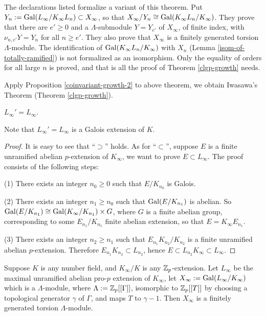 \begin{remark}
The {\Lean} declarations listed formalize a variant of this theorem. Put
$Y_n:={\mathrm{Gal}}(L_\infty/K_\infty L_n)\subset X_\infty$, so that
$X_\infty/Y_n\cong{\mathrm{Gal}}(K_\infty L_n/K_\infty)$. They prove that there are
$e'\geq 0$ and a $\Lambda$-submodule $Y=Y_{e'}$ of $X_\infty$, of finite index,
with $\nu_{n,e'}Y=Y_n$ for all $n\geq e'$. They also prove that $X_\infty$ is a
finitely generated torsion $\Lambda$-module. The identification of
${\mathrm{Gal}}(K_\infty L_n/K_\infty)$ with $X_n$ (Lemma \ref{isom-of-totally-ramified})
is not formalized as an isomorphism. Only the equality of orders for all large
$n$ is proved, and that is all the proof of Theorem \ref{clgp-growth} needs.
\end{remark}

Apply Proposition \ref{coinvariant-growth-2} to above theorem,
we obtain Iwasawa's Theorem (Theorem \ref{clgp-growth}).

\iffalse
\begin{prop}
\label{Zp-ext-L-eq-L}
$L_\infty'=L_\infty$.
\end{prop}

Note that $L_\infty'=L_\infty$ is a Galois extension of $K$.

\begin{proof}
It is easy to see that ``$\supset$'' holds.
As for ``$\subset$'', suppose $E$ is a finite
unramified abelian $p$-extension of $K_\infty$,
we want to prove $E\subset L_\infty$. The proof consists of the following steps:

(1) There exists an integer $n_0\geq 0$ such that $E/K_{n_0}$ is Galois.

(2) There exists an integer $n_1\geq n_0$ such that ${\mathrm{Gal}}(E/K_{n_1})$ is abelian.
So ${\mathrm{Gal}}(E/K_{n_1})\cong{\mathrm{Gal}}(K_\infty/K_{n_1})\times G$,
where $G$ is a finite abelian group, corresponding to some $E_{n_1}/K_{n_1}$
finite abelian extension, so that $E=K_\infty E_{n_1}$.

(3) There exists an integer $n_2\geq n_1$ such that $E_{n_1}K_{n_2}/K_{n_2}$
is a finite unramified abelian $p$-extension. Therefore $E_{n_1}K_{n_2}\subset L_{n_2}$,
hence $E\subset L_{n_2}K_\infty\subset L_\infty$.
\end{proof}

\begin{thm}[Iwasawa]\label{p:f-g-torsion2}
Suppose $K$ is any number field, and $K_\infty/K$ is any ${\mathbb {Z}}_p$-extension.
Let $L_\infty$ be the maximal unramified abelian pro-$p$ extension of $K_\infty$,
let $X_\infty:={\mathrm{Gal}}(L_\infty/K_\infty)$ which is a $\Lambda$-module,
where $\Lambda:={\mathbb {Z}}_p[[\Gamma]]$, isomorphic to ${\mathbb {Z}}_p[[T]]$
by choosing a topological generator $\gamma$ of $\Gamma$,
and maps $T$ to $\gamma-1$. Then $X_\infty$ is a finitely generated torsion
$\Lambda$-module.
\end{thm}

